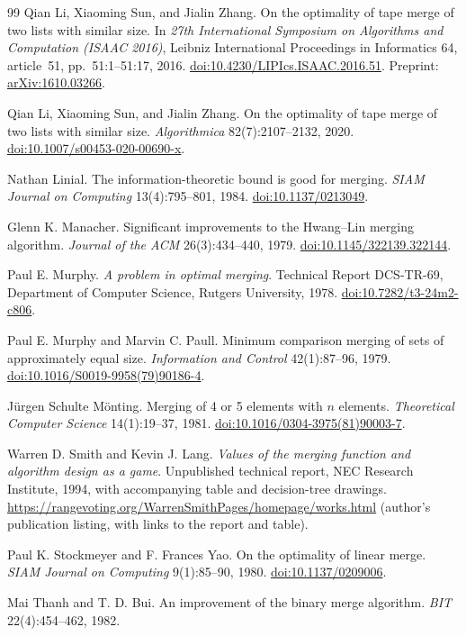\documentclass[11pt]{article}
\theoremstyle{definition}
\theoremstyle{remark}
\begin{document}
\begin{thebibliography}{99}
Qian Li, Xiaoming Sun, and Jialin Zhang.
On the optimality of tape merge of two lists with similar size.
In \emph{27th International Symposium on Algorithms and Computation
(ISAAC 2016)}, Leibniz International Proceedings in Informatics 64,
article~51, pp.~51:1--51:17, 2016.
\href{https://doi.org/10.4230/LIPIcs.ISAAC.2016.51}{doi:10.4230/LIPIcs.ISAAC.2016.51}.
Preprint: \href{https://arxiv.org/abs/1610.03266}{arXiv:1610.03266}.

Qian Li, Xiaoming Sun, and Jialin Zhang.
On the optimality of tape merge of two lists with similar size.
\emph{Algorithmica} 82(7):2107--2132, 2020.
\href{https://doi.org/10.1007/s00453-020-00690-x}{doi:10.1007/s00453-020-00690-x}.

Nathan Linial.
The information-theoretic bound is good for merging.
\emph{SIAM Journal on Computing} 13(4):795--801, 1984.
\href{https://doi.org/10.1137/0213049}{doi:10.1137/0213049}.

Glenn K. Manacher.
Significant improvements to the Hwang--Lin merging algorithm.
\emph{Journal of the ACM} 26(3):434--440, 1979.
\href{https://doi.org/10.1145/322139.322144}{doi:10.1145/322139.322144}.

Paul E. Murphy.
\emph{A problem in optimal merging}.
Technical Report DCS-TR-69, Department of Computer Science,
Rutgers University, 1978.
\href{https://doi.org/10.7282/t3-24m2-c806}{doi:10.7282/t3-24m2-c806}.

Paul E. Murphy and Marvin C. Paull.
Minimum comparison merging of sets of approximately equal size.
\emph{Information and Control} 42(1):87--96, 1979.
\href{https://doi.org/10.1016/S0019-9958(79)90186-4}{doi:10.1016/S0019-9958(79)90186-4}.

J\"urgen Schulte M\"onting.
Merging of 4 or 5 elements with $n$ elements.
\emph{Theoretical Computer Science} 14(1):19--37, 1981.
\href{https://doi.org/10.1016/0304-3975(81)90003-7}{doi:10.1016/0304-3975(81)90003-7}.

Warren D. Smith and Kevin J. Lang.
\emph{Values of the merging function and algorithm design as a game}.
Unpublished technical report, NEC Research Institute, 1994, with
accompanying table and decision-tree drawings.
\url{https://rangevoting.org/WarrenSmithPages/homepage/works.html}
(author's publication listing, with links to the report and table).

Paul K. Stockmeyer and F. Frances Yao.
On the optimality of linear merge.
\emph{SIAM Journal on Computing} 9(1):85--90, 1980.
\href{https://doi.org/10.1137/0209006}{doi:10.1137/0209006}.

Mai Thanh and T. D. Bui.
An improvement of the binary merge algorithm.
\emph{BIT} 22(4):454--462, 1982.

\end{thebibliography}
\end{document}
